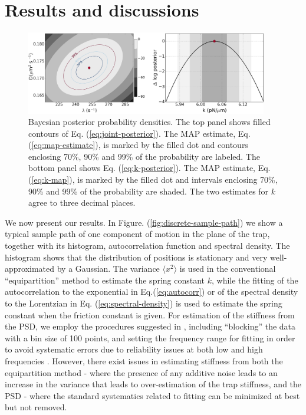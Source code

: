 \documentclass[english,aps, onecolumn, prl,superscriptaddress, notitlepage]{revtex4-1}
\begin{document}
\section{Results and discussions\label{sec:Results}}

\begin{figure}[t!]
\includegraphics[width=0.94\textwidth]{figure3.jpg}
\caption{Bayesian posterior probability densities. The top panel shows filled
contours of Eq. (\ref{eq:joint-posterior}). The MAP estimate, Eq.
(\ref{eq:map-estimate}), is marked by the filled dot and contours
enclosing 70\%, 90\% and 99\% of the probability are labeled. The
bottom panel shows Eq. (\ref{eq:k-posterior}). The MAP estimate,
Eq. (\ref{eq:k-map}), is marked by the filled dot and intervals enclosing
70\%, 90\% and 99\% of the probability are shaded. The two estimates
for $k$ agree to three decimal places.\label{fig:bayes-I-and-II}}
\end{figure}

We now present our results. In Figure. (\ref{fig:discrete-sample-path})
we show a typical sample path of one component of motion in the plane
of the trap, together with its histogram, autocorrelation function
and spectral density. The histogram shows that the distribution of
positions is stationary and very well-approximated by a Gaussian.
The variance $\langle x^{2}\rangle$ is used in the conventional ``equipartition''
method to estimate the spring constant $k$, while the fitting of
the autocorrelation to the exponential in Eq.(\ref{eq:autocorr})
or of the spectral density to the Lorentzian in Eq. (\ref{eq:spectral-density})
is used to estimate the spring constant when the friction constant
is given. For estimation of the stiffness from the PSD, we employ
the procedures suggested in \cite{berg2004power}, including ``blocking''
the data with a bin size of 100 points, and setting the frequency
range for fitting in order to avoid systematic errors due to reliability
issues at both low and high frequencies \cite{berg2004power}. However,
there exist issues in estimating stiffness from both the equipartition
method - where the presence of any additive noise leads to an increase
in the variance that leads to over-estimation of the trap stiffness,
and the PSD - where the standard systematics related to fitting can
be minimized at best but not removed. 
\end{document}
